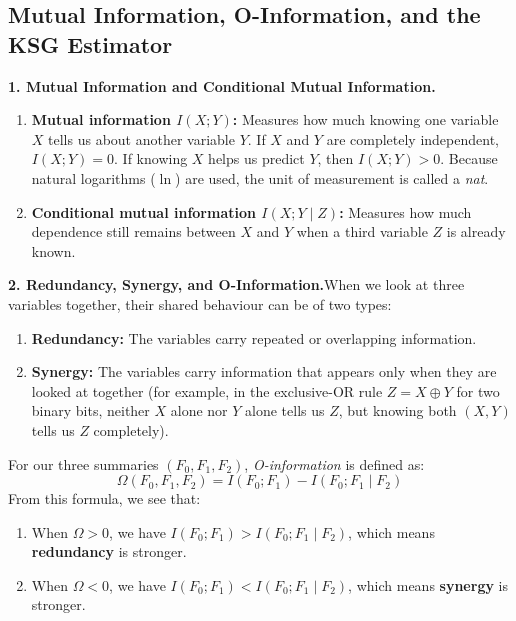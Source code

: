 \documentclass[11pt,a4paper,oneside]{report}
\newcommand{\Fzero}{F_{0}}
\newcommand{\Fone}{F_{1}}
\newcommand{\Ftwo}{F_{2}}
\begin{document}
\subsection{Mutual Information, O-Information, and the KSG Estimator}

\noindent\textbf{1. Mutual Information and Conditional Mutual Information.}
\begin{enumerate}[label=\textbf{(\roman*)}]
\item \textbf{Mutual information $I(X; Y)$:} Measures how much knowing one variable $X$ tells us about another variable $Y$. If $X$ and $Y$ are completely independent, $I(X; Y) = 0$. If knowing $X$ helps us predict $Y$, then $I(X; Y) > 0$. Because natural logarithms ($\ln$) are used, the unit of measurement is called a \emph{nat}.
\item \textbf{Conditional mutual information $I(X; Y \mid Z)$:} Measures how much dependence still remains between $X$ and $Y$ when a third variable $Z$ is already known.
\end{enumerate}

\noindent\textbf{2. Redundancy, Synergy, and O-Information.}\quad When we look at three variables together, their shared behaviour can be of two types:
\begin{enumerate}[label=\textbf{(\roman*)}]
\item \textbf{Redundancy:} The variables carry repeated or overlapping information.
\item \textbf{Synergy:} The variables carry information that appears only when they are looked at together (for example, in the exclusive-OR rule $Z = X \oplus Y$ for two binary bits, neither $X$ alone nor $Y$ alone tells us $Z$, but knowing both $(X, Y)$ tells us $Z$ completely).
\end{enumerate}
For our three summaries $(\Fzero, \Fone, \Ftwo)$, \emph{O-information} is defined as:
\begin{equation}
\boxed{\Omega(\Fzero, \Fone, \Ftwo) = I(\Fzero; \Fone) - I(\Fzero; \Fone \mid \Ftwo)}
\end{equation}
From this formula, we see that:
\begin{enumerate}[label=\textbf{(\roman*)}]
\item When $\Omega > 0$, we have $I(\Fzero; \Fone) > I(\Fzero; \Fone \mid \Ftwo)$, which means \textbf{redundancy} is stronger.
\item When $\Omega < 0$, we have $I(\Fzero; \Fone) < I(\Fzero; \Fone \mid \Ftwo)$, which means \textbf{synergy} is stronger.
\end{enumerate}
\end{document}
